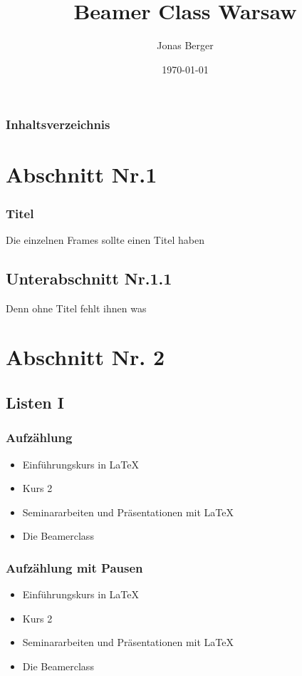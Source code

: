\documentclass[compress,aspectratio=169]{beamer} %
\title{Beamer Class Warsaw}
\author{Jonas Berger}
\date{\today}
\begin{document}
	
	\begin{frame}
		\titlepage
	\end{frame} 
	
	\begin{frame}
		\frametitle{Inhaltsverzeichnis}
		\tableofcontents
	\end{frame} 
	
	
	\section{Abschnitt Nr.1} 
	\begin{frame}
		\frametitle{Titel} 
		Die einzelnen Frames sollte einen Titel haben 
	\end{frame}
	\subsection{Unterabschnitt Nr.1.1  }
	\begin{frame} 
		Denn ohne Titel fehlt ihnen was
	\end{frame}
	
	
	\section{Abschnitt Nr. 2} 
	\subsection{Listen I}
	\begin{frame}\frametitle{Aufz\"ahlung}
		\begin{itemize}
			\item Einf\"uhrungskurs in \LaTeX  
			\item Kurs 2  
			\item Seminararbeiten und Pr\"asentationen mit \LaTeX 
			\item Die Beamerclass 
		\end{itemize} 
	\end{frame}
	
	\begin{frame}\frametitle{Aufz\"ahlung mit Pausen}
		\begin{itemize}
			\item  Einf\"uhrungskurs in \LaTeX \pause 
			\item  Kurs 2 \pause 
			\item  Seminararbeiten und Pr\"asentationen mit \LaTeX \pause 
			\item  Die Beamerclass
		\end{itemize} 
	\end{frame}
	
\end{document}
